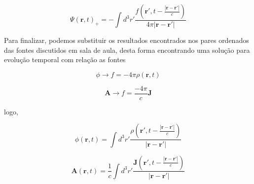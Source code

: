 \begin{equation}
	\Psi (\textbf{r}, t)_{+} = 
	-\int d^3 r'\frac{f(\textbf{r}', t -\frac{|\textbf{r}-\textbf{r}'|}{c})}{4\pi|\textbf{r}-\textbf{r}'|}
\end{equation}

Para finalizar, podemos substituir os resultados encontrados nos pares ordenados das fontes discutidos em sala de aula, desta forma encontrando uma solução para evolução temporal com relação as fontes

\begin{equation*}
	\phi \rightarrow f = -4\pi\rho(\textbf{r},t)
\end{equation*}

\begin{equation*}
	\textbf{A} \rightarrow f = \frac{-4\pi}{c}\textbf{J}
\end{equation*}

logo,

\begin{equation}
	\phi (\textbf{r}, t) = 
	\int d^3 r'\frac{\rho(\textbf{r}', t -\frac{|\textbf{r}-\textbf{r}'|}{c})}{|\textbf{r}-\textbf{r}'|}
	\label{eq2:potencialescalar}
\end{equation}

\begin{equation}
	\textbf{A} (\textbf{r}, t) = 
	\frac{1}{c}\int d^3 r'\frac{\textbf{J}(\textbf{r}', t -\frac{|\textbf{r}-\textbf{r}'|}{c})}{|\textbf{r}-\textbf{r}'|}	
\end{equation}




%
%
%
%
%
%
%
%
%
